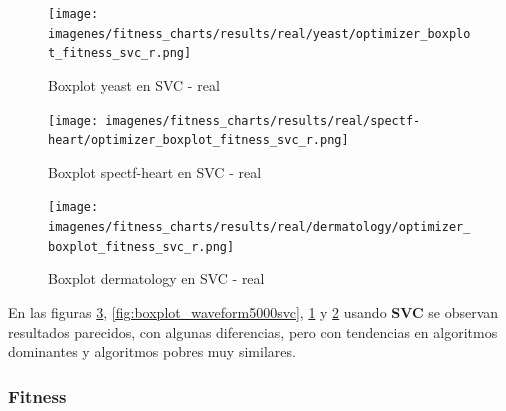 \begin{figure}[htp]
    \centering
    \texttt{[image: imagenes/fitness\_charts/results/real/yeast/optimizer\_boxplot\_fitness\_svc\_r.png]}
    \caption{Boxplot yeast en SVC - real}
    \label{fig:boxplot_yeastsvc}
\end{figure}

\begin{figure}[htp]
    \centering
    \texttt{[image: imagenes/fitness\_charts/results/real/spectf-heart/optimizer\_boxplot\_fitness\_svc\_r.png]}
    \caption{Boxplot spectf-heart en SVC - real}
    \label{fig:boxplot_spectf-heartsvc}
\end{figure}

\begin{figure}[htp]
    \centering
    \texttt{[image: imagenes/fitness\_charts/results/real/dermatology/optimizer\_boxplot\_fitness\_svc\_r.png]}
    \caption{Boxplot dermatology en SVC - real}
    \label{fig:boxplot_dermatologysvc}
\end{figure}

En las figuras \ref{fig:boxplot_dermatologysvc}, \ref{fig:boxplot_waveform5000svc}, \ref{fig:boxplot_yeastsvc} y \ref{fig:boxplot_spectf-heartsvc} usando \textbf{SVC} se observan resultados parecidos, con algunas diferencias, pero con tendencias en algoritmos dominantes y algoritmos pobres muy similares.

\subsubsection{Fitness}